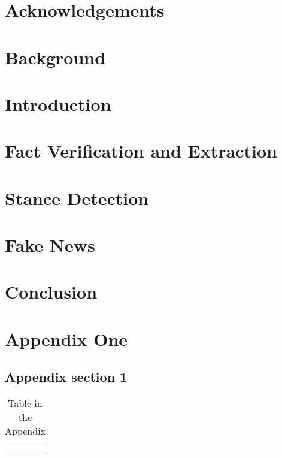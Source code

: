 \documentclass[11pt]{book}
\begin{document}

\doublespacing



\chapter*{Acknowledgements}



\tableofcontents{}
\listoffigures
\listoftables
\clearpage

\chapter {Background}


% 

\chapter {Introduction}


\chapter {Fact Verification and Extraction}
\label{chapter:two}


\chapter{Stance Detection}
\label{chapter:three}


\chapter {Fake News}
\label{chapter:four}


\chapter{Conclusion}





\newpage
\newcommand{\beginsupplement}{%
    \setcounter{chapter}{0}
    \renewcommand{\thechapter}{\Alph{chapter}}%
 }

\beginsupplement
\chapter{Appendix One}
\section{Appendix section 1}
\begin{table}[]
    \centering
    \begin{tabular}{c|c}
         &  \\
         & 
    \end{tabular}
    \caption{Table in the Appendix}
    \label{tab:my_label}
\end{table}
\end{document}
